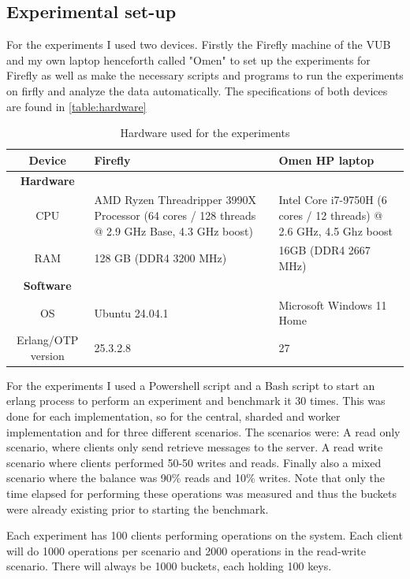 \documentclass{article}
\begin{document}
\subsection{Experimental set-up}
\label{sec:experimental-set-up}
For the experiments I used two devices. Firstly the Firefly machine of the VUB
and my own laptop henceforth called "Omen" to set up the experiments for Firefly
as well as make the necessary scripts and programs to run the experiments on
firfly and analyze the data automatically. The specifications of both devices
are found in \autoref{table:hardware}
\begin{table}[H]
	\centering
	\begin{tabularx}{\textwidth}{c | X | X}
		Device                       & Firefly                                                   & Omen HP laptop            \\
		\hline
		\textbf{Hardware}            &                                                           &                           \\
		CPU                          & AMD Ryzen Threadripper 3990X Processor
		(64 cores / 128 threads @
		2.9 GHz Base, 4.3 GHz boost) & Intel Core i7-9750H (6 cores / 12 threads) @ 2.6 GHz, 4.5
		Ghz boost                                                                                                            \\
		\hline
		RAM                          & 128 GB (DDR4 3200 MHz)
		                             & 16GB (DDR4 2667 MHz)                                                                  \\
		\hline
		\textbf{Software}            &                                                           &                           \\
		OS                           & Ubuntu 24.04.1                                            & Microsoft Windows 11 Home \\
		\hline
		Erlang/OTP version           & 25.3.2.8                                                  & 27                        \\
	\end{tabularx}
	\caption{Hardware used for the experiments}
	\label{table:hardware}
\end{table}
For the experiments I used a Powershell script and a Bash script to start an
erlang process to perform an experiment and benchmark it 30 times. This was done
for each implementation, so for the central, sharded and worker implementation
and for three different scenarios. The scenarios were: A read only scenario,
where clients only send retrieve messages to the server. A read write scenario
where clients performed 50-50 writes and reads. Finally also a mixed scenario
where the balance was 90\% reads and 10\% writes. Note that only the time
elapsed for performing these operations was measured and thus the buckets were
already existing prior to starting the benchmark. \par
Each experiment has 100 clients performing operations on the system. Each client
will do 1000 operations per scenario and 2000 operations in the read-write
scenario. There will always be 1000 buckets, each holding 100 keys.
\end{document}
